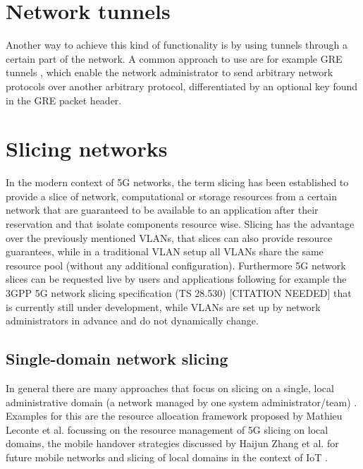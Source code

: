 \section{Network tunnels} Another way to achieve this kind of functionality is by using tunnels through a certain part of the network. A common approach to use are for example GRE tunnels \cite{rfc2784}, which enable the network administrator to send arbitrary network protocols over another arbitrary protocol, differentiated by an optional key found in the GRE packet header.

\section{Slicing networks} In the modern context of 5G networks, the term slicing has been established to provide a slice of network, computational or storage resources from a certain network that are guaranteed to be available to an application after their reservation \cite{5G1,5G2,5G3,5G4} and that isolate components resource wise. Slicing has the advantage over the previously mentioned VLANs, that slices can also provide resource guarantees, while in a traditional VLAN setup all VLANs share the same resource pool (without any additional configuration). Furthermore 5G network slices can be requested live by users and applications following for example the 3GPP 5G network slicing specification (TS 28.530) [CITATION NEEDED] that is currently still under development, while VLANs are set up by network administrators in advance and do not dynamically change.


\subsection{Single-domain network slicing} In general there are many approaches that focus on slicing on a single, local administrative domain (a network managed by one system administrator/team) \cite{SD1,SD2,SD3}. Examples for this are the resource allocation framework proposed by Mathieu Leconte et al. \cite{SD3} focussing on the resource management of 5G slicing on local domains, the mobile handover strategies discussed by Haijun Zhang et al. \cite{SD1} for future mobile networks and slicing of local domains in the context of IoT \cite{SD2}. 

